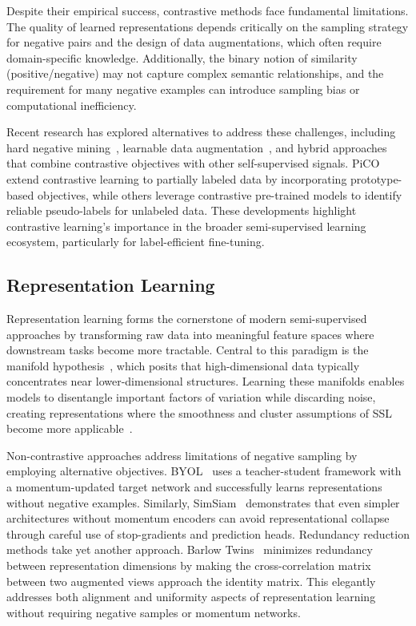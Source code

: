 Despite their empirical success, contrastive methods face fundamental limitations. The quality of learned representations depends critically on the sampling strategy for negative pairs and the design of data augmentations, which often require domain-specific knowledge. Additionally, the binary notion of similarity (positive/negative) may not capture complex semantic relationships, and the requirement for many negative examples can introduce sampling bias or computational inefficiency.

Recent research has explored alternatives to address these challenges, including hard negative mining~\cite{robinson2020contrastive}, learnable data augmentation~\cite{morerio2024model}, and hybrid approaches that combine contrastive objectives with other self-supervised signals. PiCO~\cite{wang2022pico} extend contrastive learning to partially labeled data by incorporating prototype-based objectives, while others leverage contrastive pre-trained models to identify reliable pseudo-labels for unlabeled data. These developments highlight contrastive learning's importance in the broader semi-supervised learning ecosystem, particularly for label-efficient fine-tuning.

\subsection{Representation Learning}

Representation learning forms the cornerstone of modern semi-supervised approaches by transforming raw data into meaningful feature spaces where downstream tasks become more tractable. Central to this paradigm is the manifold hypothesis~\cite{whiteley2022statistical}, which posits that high-dimensional data typically concentrates near lower-dimensional structures. Learning these manifolds enables models to disentangle important factors of variation while discarding noise, creating representations where the smoothness and cluster assumptions of SSL become more applicable~\cite{sohn2020fixmatch}.

Non-contrastive approaches address limitations of negative sampling by employing alternative objectives. BYOL~\cite{grill2020bootstrap} uses a teacher-student framework with a momentum-updated target network and successfully learns representations without negative examples. Similarly, SimSiam~\cite{chen2020exploring} demonstrates that even simpler architectures without momentum encoders can avoid representational collapse through careful use of stop-gradients and prediction heads. Redundancy reduction methods take yet another approach. Barlow Twins~\cite{zbontar2021barlow} minimizes redundancy between representation dimensions by making the cross-correlation matrix between two augmented views approach the identity matrix. This elegantly addresses both alignment and uniformity aspects of representation learning without requiring negative samples or momentum networks.

